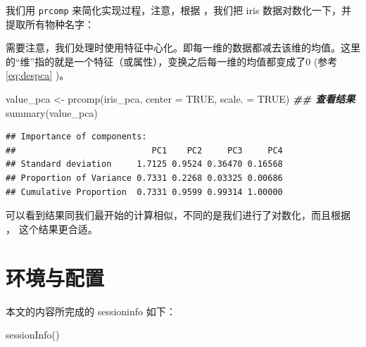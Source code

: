 \documentclass[
]{krantz}
\makeatletter
\newenvironment{Shaded}{\begin{snugshade}}{\end{snugshade}}
\newcommand{\AttributeTok}[1]{\textcolor[rgb]{0.77,0.63,0.00}{#1}}
\newcommand{\ConstantTok}[1]{\textcolor[rgb]{0.00,0.00,0.00}{#1}}
\newcommand{\DecValTok}[1]{\textcolor[rgb]{0.00,0.00,0.81}{#1}}
\newcommand{\DocumentationTok}[1]{\textcolor[rgb]{0.56,0.35,0.01}{\textbf{\textit{#1}}}}
\newcommand{\FunctionTok}[1]{\textcolor[rgb]{0.00,0.00,0.00}{#1}}
\newcommand{\NormalTok}[1]{#1}
\newcommand{\OtherTok}[1]{\textcolor[rgb]{0.56,0.35,0.01}{#1}}
\newcommand{\SpecialCharTok}[1]{\textcolor[rgb]{0.00,0.00,0.00}{#1}}
\newcommand{\StringTok}[1]{\textcolor[rgb]{0.31,0.60,0.02}{#1}}
\newenvironment{kframe}{%
\medskip{}
\setlength{\fboxsep}{.8em}
 \def\at@end@of@kframe{}%
 \ifinner\ifhmode%
  \def\at@end@of@kframe{\end{minipage}}%
  \begin{minipage}{\columnwidth}%
 \fi\fi%
 \def\FrameCommand##1{\hskip\@totalleftmargin \hskip-\fboxsep
 \colorbox{shadecolor}{##1}\hskip-\fboxsep
     \hskip-\linewidth \hskip-\@totalleftmargin \hskip\columnwidth}%
 \MakeFramed {\advance\hsize-\width
   \@totalleftmargin\z@ \linewidth\hsize
   \@setminipage}}%
 {\par\unskip\endMakeFramed%
 \at@end@of@kframe}
\renewenvironment{Shaded}{\begin{kframe}}{\end{kframe}}
\makeatother
\begin{document}
我们用 \texttt{prcomp} 来简化实现过程，注意，根据 \citet{kemp2003modern}，我们把 iris 数据对数化一下，并提取所有物种名字：

\begin{Shaded}
\end{Shaded}

需要注意，我们处理时使用特征中心化。即每一维的数据都减去该维的均值。这里的``维''指的就是一个特征（或属性），变换之后每一维的均值都变成了0 (参考 \eqref{eq:despca} )。

\begin{Shaded}
\begin{Highlighting}[]
\NormalTok{value\_pca }\OtherTok{\textless{}{-}} \FunctionTok{prcomp}\NormalTok{(iris\_pca, }\AttributeTok{center =} \ConstantTok{TRUE}\NormalTok{, }\AttributeTok{scale. =} \ConstantTok{TRUE}\NormalTok{)}
\DocumentationTok{\#\# 查看结果}
\FunctionTok{summary}\NormalTok{(value\_pca)}
\end{Highlighting}
\end{Shaded}

\begin{verbatim}
## Importance of components:
##                           PC1    PC2     PC3     PC4
## Standard deviation     1.7125 0.9524 0.36470 0.16568
## Proportion of Variance 0.7331 0.2268 0.03325 0.00686
## Cumulative Proportion  0.7331 0.9599 0.99314 1.00000
\end{verbatim}

可以看到结果同我们最开始的计算相似，不同的是我们进行了对数化，而且根据 \citet{kemp2003modern}， 这个结果更合适。

\hypertarget{sessioninfo}{%
\chapter{环境与配置}\label{sessioninfo}}

本文的内容所完成的 sessioninfo 如下：

\begin{Shaded}
\begin{Highlighting}[]
\FunctionTok{sessionInfo}\NormalTok{()}
\end{Highlighting}
\end{Shaded}
\end{document}
